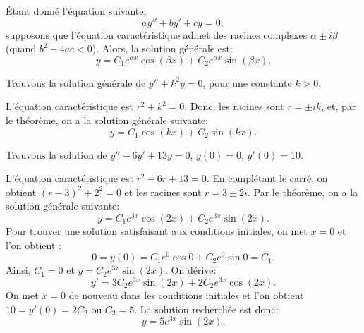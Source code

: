 \begin{theorem}
	Étant donné l'équation suivante,
	\begin{equation*}
		ay'' + by' + cy = 0,  
	\end{equation*}
	supposons que l'équation caractéristique admet des racines complexes $\alpha \pm i \beta$
	(quand $b^2 - 4ac < 0$).
	Alors, la solution générale est: 
	\begin{equation*}
		y = C_1 e^{\alpha x} \cos (\beta x) + C_2 e^{\alpha x} \sin (\beta x) .
	\end{equation*}
\end{theorem}

\begin{example} \label{example:sincossecondorder}
	Trouvons la solution générale de $y'' + k^2 y = 0$, pour une constante  $k > 0$.
	
	L'équation caractéristique est  $r^2 + k^2 = 0$.  
	Donc, les racines sont $r = \pm ik$, et, par le théorème, on a la solution générale  suivante:
	\begin{equation*}
		y = C_1 \cos (kx) + C_2 \sin (kx) .
	\end{equation*}
\end{example}

\begin{example}
	Trouvons la solution de  $y'' - 6 y' + 13 y = 0$, $y(0) = 0$, $y'(0) = 10$.
	
	L'équation caractéristique est  $r^2 - 6 r + 13 = 0$. 
	En complétant le carré, on obtient   ${(r-3)}^2 + 2^2 = 0$ et les racines sont
	$r = 3 \pm 2i$.
	Par le théorème, on a la solution générale suivante:
	\begin{equation*}
		y = C_1 e^{3x} \cos (2x) + C_2 e^{3x} \sin (2x) .
	\end{equation*}
	Pour trouver une solution satisfaisant aux conditions initiales, on met $x=0$ et l'on obtient :
	\begin{equation*}
		0 = y(0) = C_1 e^{0} \cos 0 + C_2 e^{0} \sin 0  = C_1 .
	\end{equation*}
	Ainsi, $C_1 = 0$ et $y = C_2 e^{3x} \sin (2x)$.  On dérive: 
	\begin{equation*}
		y' = 3C_2 e^{3x} \sin (2x) + 2C_2 e^{3x} \cos (2x) .
	\end{equation*}
	On met $x=0$ de nouveau dans les conditions initiales et l'on obtient  $10 = y'(0) = 2C_2$ ou
	$C_2 = 5$.  La solution recherchée est donc:
	\begin{equation*}
		y = 5 e^{3x} \sin (2x) .
	\end{equation*}
\end{example}

